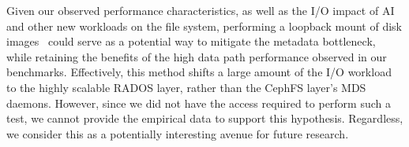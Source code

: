 Given our observed performance characteristics, as well as the \ac{I/O} impact of \ac{AI} and other new workloads on the file system, performing a loopback mount of disk images~\cite{Krotkiewski_2017} could serve as a potential way to mitigate the metadata bottleneck, while retaining the benefits of the high data path performance observed in our benchmarks. Effectively, this method shifts a large amount of the \ac{I/O} workload to the highly scalable \ac{RADOS} layer, rather than the \ac{CephFS} layer's \ac{MDS} daemons. However, since we did not have the access required to perform such a test, we cannot provide the empirical data to support this hypothesis. Regardless, we consider this as a potentially interesting avenue for future research.

